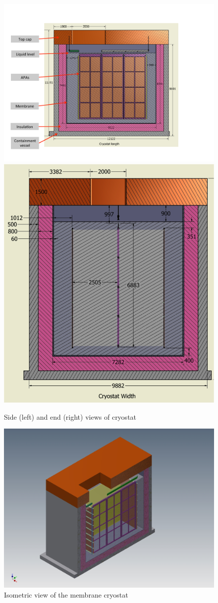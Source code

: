 \begin{figure}
\begin{center}
\includegraphics[width=.55\textwidth]{figures/cryostat-side-view} %
\includegraphics[width=.35\textwidth]{figures/cryostat-end-view}  %
\caption[Views of cryostat]{\label{fig:cryostat-views} Side (left) and end (right) views of cryostat}
\end{center}
\end{figure}

\begin{figure}
\begin{center}
\includegraphics[width=.75\textwidth]{figures/cryostat-isometric-view} %
\caption[Isometric view of cryostat]{\label{fig:cryostat-views} Isometric view of the membrane cryostat}
\end{center}
\end{figure}

